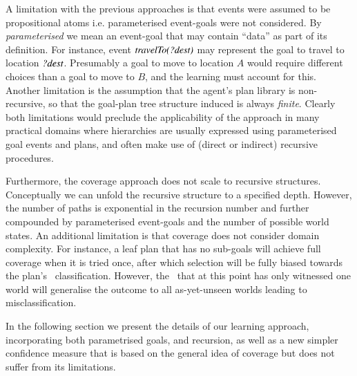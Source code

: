 A limitation with the previous approaches is that 
events were assumed to be propositional atoms i.e. parameterised event-goals
were not considered. By \emph{parameterised} we mean an event-goal that may
contain ``data'' as part of its definition. For instance, event
${\mbox{\textit{travelTo(?dest)}}}$ may represent the goal to travel to location
${\mbox{\textit{?dest}}}$. Presumably a goal to move to location $A$ would 
require different choices than a goal to move to $B$, and the learning
must account for this.
Another limitation is the assumption that the agent's plan library is
non-recursive, so that the goal-plan tree structure induced is always
\emph{finite}.
Clearly both limitations would preclude the applicability of the approach in
many practical domains where hierarchies are usually expressed
using parameterised goal events and plans, and often make
use of (direct or indirect) recursive procedures.



Furthermore, the coverage approach \cite{Singh:AAMAS10} does not scale
to recursive structures. 
Conceptually we can unfold the recursive structure to a
specified depth. However, the number of paths is exponential in the
recursion number and further compounded by parameterised event-goals
and the number of possible world states.
%
An additional limitation is that coverage does not consider domain
complexity. For instance, a leaf plan that has no sub-goals will
achieve full coverage when it is tried once, after which selection
will be fully biased towards the plan's \dt\ classification. However,
the \dt\ that at this point has only witnessed one world will
generalise the outcome to all as-yet-unseen worlds leading to
misclassification. 

In the following section we present the details of our learning
approach, incorporating both parametrised goals, and recursion, as
well as a new simpler confidence measure that is based on the 
general idea of coverage but does not suffer from its limitations.







